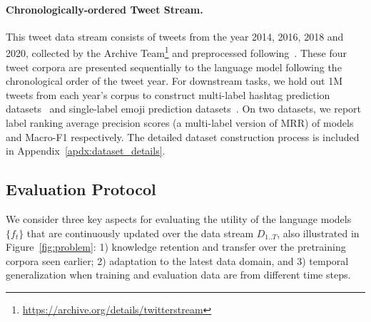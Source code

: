 \paragraph{Chronologically-ordered Tweet Stream.} 
This tweet data stream consists of tweets from the year 2014, 2016, 2018 and 2020, collected by the Archive Team\footnote{\scriptsize{\url{https://archive.org/details/twitterstream}}} and preprocessed following~\citet{nguyen2020bertweet}. These four tweet corpora are presented sequentially to the language model following the chronological order of the tweet year.
For downstream tasks, we hold out 1M tweets from each year's corpus to construct multi-label hashtag prediction datasets~\cite{Gong2016HashtagRU} and single-label emoji prediction datasets~\cite{Barbieri2018SemEval2T}. On two datasets, we report label ranking average precision scores (a multi-label version of MRR) of models ~\cite{Azeemi2021COVID19TA} and Macro-F1 respectively. The detailed dataset construction process is included in Appendix~\ref{apdx:dataset_details}. 



\subsection{Evaluation Protocol}
\label{ssec:evaluation_protocols}

We consider three key aspects for evaluating the utility of the language models $\{f_t\}$ that are continuously updated over the data stream $D_{1..T}$, also illustrated in Figure~\ref{fig:problem}: 
1) knowledge retention and transfer over the pretraining corpora seen earlier; 2) adaptation to the latest data domain, and 3) temporal generalization when training and evaluation data are from different time steps.

